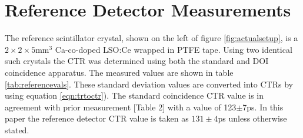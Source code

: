 \section{Reference Detector Measurements}
\label{sec:reference}
The reference scintillator crystal, shown on the left of figure \ref{fig:actualsetup}, is a $2\times2\times5$mm$^3$ Ca-co-doped LSO:Ce wrapped in PTFE tape. Using two identical such crystals the CTR was determined using both the standard and DOI coincidence apparatus. The measured values are shown in table \ref{tab:referencevals}. These standard deviation values are converted into CTRs by using equation \ref{eqn:trtoctr}). The standard coincidence CTR value is in agreement with prior measurement [Table 2]\cite{uffray_Jarron_Meyer_Lecoq_2014} with a value of 123$\pm$7ps. In this paper the reference detector CTR value is taken as $131\pm4$ps unless otherwise stated.
